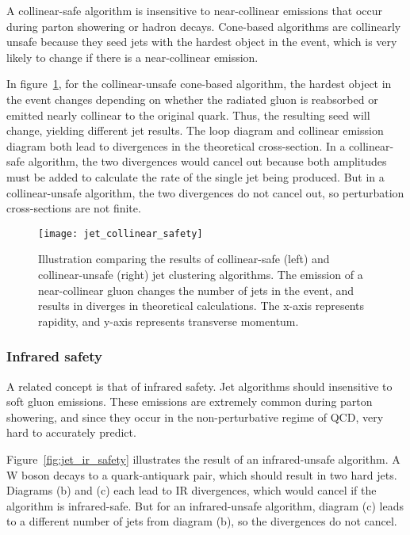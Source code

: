 A collinear-safe algorithm is insensitive to near-collinear emissions that occur during parton showering or hadron decays.
Cone-based algorithms are collinearly unsafe because they seed jets with the hardest object in the event,
which is very likely to change if there is a near-collinear emission.

In figure~\ref{fig:jet_collinear_safety}, for the collinear-unsafe cone-based algorithm,
the hardest object in the event changes depending on whether the radiated gluon is reabsorbed or emitted nearly collinear to the original quark.
Thus, the resulting seed will change, yielding different jet results.
The loop diagram and collinear emission diagram both lead to divergences in the theoretical cross-section.
In a collinear-safe algorithm, the two divergences would cancel out because both amplitudes must be added to calculate the rate
of the single jet being produced.
But in a collinear-unsafe algorithm, the two divergences do not cancel out, so perturbation cross-sections are not finite.

\begin{figure}[!ht]
    \centering
\texttt{[image: jet\_collinear\_safety]}
\caption{Illustration comparing the results of collinear-safe (left) and collinear-unsafe (right) jet clustering algorithms.
The emission of a near-collinear gluon changes the number of jets in the event, and results in diverges in theoretical calculations.
The x-axis represents rapidity, and y-axis represents transverse momentum.}
\label{fig:jet_collinear_safety}
\end{figure}\cite{jet-jetography}

\subsubsection{Infrared safety}

A related concept is that of infrared safety.
Jet algorithms should insensitive to soft gluon emissions.
These emissions are extremely common during parton showering, and since they occur in the non-perturbative regime of QCD,
very hard to accurately predict.

Figure~\ref{fig:jet_ir_safety} illustrates the result of an infrared-unsafe algorithm.
A W boson decays to a quark-antiquark pair, which should result in two hard jets.
Diagrams (b) and (c) each lead to IR divergences, which would cancel if the algorithm is infrared-safe.
But for an infrared-unsafe algorithm, diagram (c) leads to a different number of jets from diagram (b),
so the divergences do not cancel.

